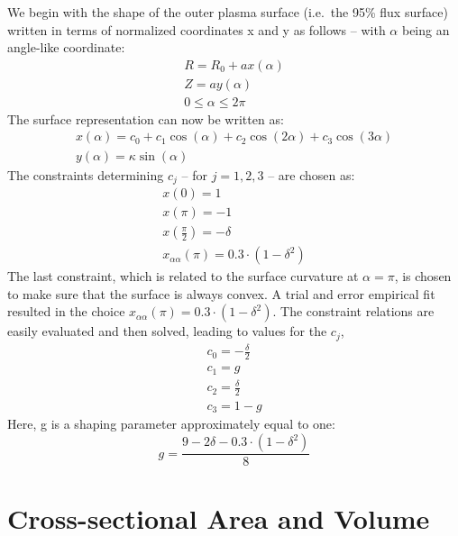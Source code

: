 We begin with the shape of the outer plasma surface (i.e.\ the 95\% flux surface) written in terms of normalized coordinates x and y as follows -- with $\alpha$ being an angle-like coordinate:
\begin{gather}
	R = R_0 + a x( \alpha ) \\
	Z = a y( \alpha ) \\
	0 \le \alpha \le 2 \pi
\end{gather}
The surface representation can now be written as:
\begin{gather}
	\label{eq:xalpha}
	x(\alpha) = c_0 + c_1 \cos(\alpha) + c_2 \cos(2\alpha) + c_3 \cos(3\alpha) \\
	\label{eq:yalpha}
	y(\alpha) = \kappa \sin(\alpha)
\end{gather}
The constraints determining $c_j$ -- for $j = 1,2,3$ -- are chosen as:
\begin{gather}
	x(0) = 1 \\
	x(\pi) = -1 \\
	x\left(\frac{\pi}{2}\right) = -\delta \\
	x_{\alpha\alpha}(\pi) = 0.3 \cdot ( 1 - \delta ^2 )
\end{gather}
The last constraint, which is related to the surface curvature at $\alpha = \pi$, is chosen to make sure that the surface is always convex. A trial and error empirical fit resulted in the choice $x_{\alpha\alpha}(\pi) = 0.3 \cdot ( 1 - \delta ^2 )$. The constraint relations are easily evaluated and then solved, leading to values for the $c_j$,
\begin{gather}
	c_0 = { - \frac{ \delta }{ 2 } } \\
	c_1 = g \\
	c_2 = { \frac{ \delta }{ 2 } } \\
	c_3 = 1 - g
\end{gather}
Here, g is a shaping parameter approximately equal to one:
\begin{equation}
	g = \frac{9 - 2 \delta - 0.3 \cdot ( 1 - \delta ^2 ) }{8}
\end{equation}

\section{Cross-sectional Area and Volume}

